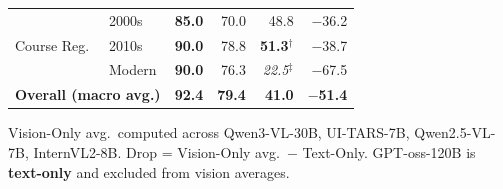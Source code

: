\documentclass[10pt]{article}
\newcommand{\tmo}[1]{\textbf{#1}}   %
\begin{document}
\begin{table}[ht]
\begin{tabular}{l l r r r r}
\multirow{3}{*}{Course Reg.}
  & 2000s  & \tmo{85.0} & 70.0 & 48.8                     & $-$36.2 \\
  & 2010s  & \tmo{90.0} & 78.8 & \textbf{51.3}$^\dagger$  & $-$38.7 \\
  & Modern & \tmo{90.0} & 76.3 & \textit{22.5}$^\ddagger$ & $-$67.5 \\

\midrule[\heavyrulewidth]

\multicolumn{2}{l}{\textbf{Overall (macro avg.)}}
  & \tmo{92.4} & \textbf{79.4} & \textbf{41.0} & $\mathbf{-}$\textbf{51.4} \\

\bottomrule
\end{tabular}

\smallskip
\noindent\footnotesize
Vision-Only avg.\ computed across Qwen3-VL-30B, UI-TARS-7B, Qwen2.5-VL-7B,
InternVL2-8B. Drop = Vision-Only avg.\ $-$ Text-Only.
GPT-oss-120B is \textbf{text-only} and excluded from vision averages.
\end{table}
\end{document}

